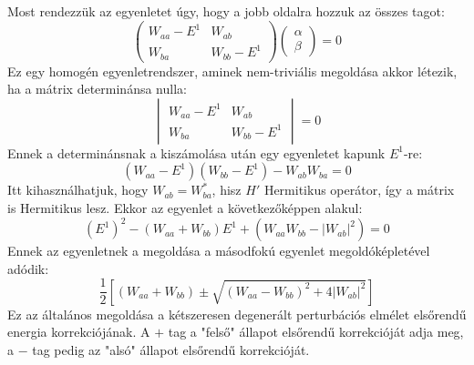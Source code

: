 \documentclass[../main.tex]{subfiles}
\begin{document}
Most rendezzük az egyenletet úgy, hogy a jobb oldalra hozzuk az összes tagot:
\begin{equation}
    \begin{pmatrix}
        W_{aa} - E^1 & W_{ab} \\
        W_{ba} & W_{bb} - E^1
    \end{pmatrix}
    \begin{pmatrix}
        \alpha \\
        \beta
    \end{pmatrix} = 0
\end{equation}
Ez egy homogén egyenletrendszer, aminek nem-triviális megoldása akkor létezik, ha a mátrix determinánsa nulla:
\begin{equation}
    \begin{vmatrix}
        W_{aa} - E^1 & W_{ab} \\
        W_{ba} & W_{bb} - E^1
    \end{vmatrix} = 0
\end{equation}
Ennek a determinánsnak a kiszámolása után egy egyenletet kapunk $E^1$-re:
\begin{equation}
    (W_{aa} - E^1)(W_{bb} - E^1) - W_{ab} W_{ba} = 0
\end{equation}
Itt kihasználhatjuk, hogy $W_{ab} = W_{ba}^*$, hisz $H'$ Hermitikus operátor, így a mátrix is Hermitikus lesz. Ekkor az egyenlet a következőképpen alakul:
\begin{equation}
    (E^1)^2 - (W_{aa} + W_{bb}) E^1 + (W_{aa} W_{bb} - |W_{ab}|^2) = 0
\end{equation}
Ennek az egyenletnek a megoldása a másodfokú egyenlet megoldóképletével adódik:
\begin{equation}
    \boxed{\frac{1}{2} \left[ (W_{aa} + W_{bb}) \pm \sqrt{(W_{aa} - W_{bb})^2 + 4 |W_{ab}|^2} \right]}
\end{equation}
Ez az általános megoldása a kétszeresen degenerált perturbációs elmélet elsőrendű energia korrekciójának. A $+$ tag a "felső" állapot elsőrendű korrekcióját adja meg, a $-$ tag pedig az "alsó" állapot elsőrendű korrekcióját.
\end{document}
